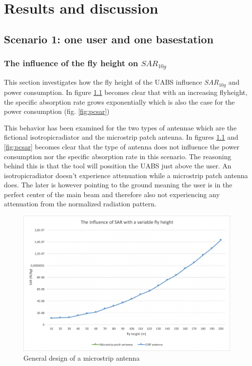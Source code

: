 \chapter{Results and discussion}
\section{Scenario 1: one user and one basestation}


\subsection{The influence of the fly height on $SAR_{10g}$}
\label{sub:senario1_influenceOfFlyHeight}

This section investigates how the fly height of the \gls{UABS} influence $SAR_{10g}$ and power consumption. In figure \ref{fig:fhsar}
becomes clear that with an increasing flyheight, the specific absorption rate grows exponentially which is also the case for the power consumption (fig. \ref{fig:pcsar})  

This behavior has been examined for the two types of antennae which are the fictional \gls{isotropicradiator} and the microstrip patch antenna. In figures 
\ref{fig:fhsar} and \ref{fig:pcsar} becomes clear that the type of antenna does not influence the power consumption nor the specific absorption rate in this  scenario.
The reasoning behind this is that the tool will possition the \gls{UABS} just above the user. An \gls{isotropicradiator} doesn't experience attenuation while a microstrip
patch antenna does. The later is however pointing to the ground meaning the user is in the perfect center of the main beam and therefore also
not experiencing any attenuation from the normalized radiation pattern.

\begin{figure}[th!]
  \includegraphics[width=\textwidth]{../results/s1/flyheight-sar.png}
  \caption{General design of a microstrip antenna}
  \label{fig:fhsar}
\end{figure}

